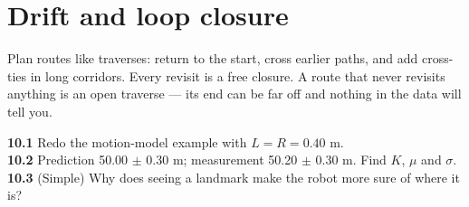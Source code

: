 \section{Drift and loop closure}

\begin{tip}
Plan routes like traverses: return to the start, cross earlier paths, and add cross-ties in long corridors. Every revisit is a free closure. A route that never revisits anything is an open traverse --- its end can be far off and nothing in the data will tell you.
\end{tip}

\begin{tryit}
\textbf{10.1} Redo the motion-model example with $L=R=0.40$ m.\\
\textbf{10.2} Prediction 50.00 $\pm$ 0.30 m; measurement 50.20 $\pm$ 0.30 m. Find $K$, $\mu$ and $\sigma$.\\
\textbf{10.3} (Simple) Why does seeing a landmark make the robot more sure of where it is?
\end{tryit}

